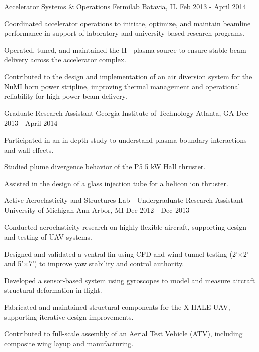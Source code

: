 \begin{cventries}
\cventry
{Accelerator Systems \& Operations}
{Fermilab}
{Batavia, IL}
{Feb 2013 - April 2014}
{
\begin{cvitems}
\item {Coordinated accelerator operations to initiate, optimize, and maintain beamline performance in support of laboratory and university-based research programs.}
\item {Operated, tuned, and maintained the H$^-$ plasma source to ensure stable beam delivery across the accelerator complex.}
\item {Contributed to the design and implementation of an air diversion system for the NuMI horn power stripline, improving thermal management and operational reliability for high-power beam delivery.}
\end{cvitems}
}
\vspace{6mm}
\cventry
{Graduate Research Assistant}
{Georgia Institute of Technology}
{Atlanta, GA}
{Dec 2013 - April 2014}
{
\begin{cvitems}
\item {Participated in an in-depth study to understand plasma boundary interactions and wall effects.}
\item {Studied plume divergence behavior of the P5 5 kW Hall thruster.}
\item {Assisted in the design of a glass injection tube for a helicon ion thruster.}
\end{cvitems}
}
\vspace{6mm}
\cventry
{Active Aeroelasticity and Structures Lab - Undergraduate Research Assistant}
{University of Michigan}
{Ann Arbor, MI}
{Dec 2012 - Dec 2013}
{
\begin{cvitems}
\item {Conducted aeroelasticity research on highly flexible aircraft, supporting design and testing of UAV systems.}
\item {Designed and validated a ventral fin using CFD and wind tunnel testing (2'×2' and 5'×7') to improve yaw stability and control authority.}
\item {Developed a sensor-based system using gyroscopes to model and measure aircraft structural deformation in flight.}
\item {Fabricated and maintained structural components for the X-HALE UAV, supporting iterative design improvements.}
\item {Contributed to full-scale assembly of an Aerial Test Vehicle (ATV), including composite wing layup and manufacturing.}
\end{cvitems}
}
\end{cventries}